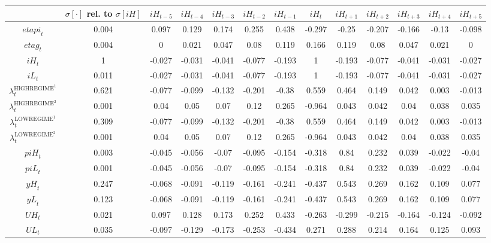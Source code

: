 \begin{tabular}{c|c|c|c|c|c|c|c|c|c|c|c|c|}
  & $\sigma[\cdot]$ rel. to $\sigma[{i\!H}]$ & ${i\!H}_{t-5}$ & ${i\!H}_{t-4}$ & ${i\!H}_{t-3}$ & ${i\!H}_{t-2}$ & ${i\!H}_{t-1}$ & ${i\!H}_{t}$ & ${i\!H}_{t+1}$ & ${i\!H}_{t+2}$ & ${i\!H}_{t+3}$ & ${i\!H}_{t+4}$ & ${i\!H}_{t+5}$\\
\hline
${e\!t\!a\!p\!i}_{t}$ & 0.004 & 0.097 & 0.129 & 0.174 & 0.255 & 0.438 & -0.297 & -0.25 & -0.207 & -0.166 & -0.13 & -0.098 \\
${e\!t\!a\!g}_{t}$ & 0.004 & 0 & 0.021 & 0.047 & 0.08 & 0.119 & 0.166 & 0.119 & 0.08 & 0.047 & 0.021 & 0 \\
${i\!H}_{t}$ & 1 & -0.027 & -0.031 & -0.041 & -0.077 & -0.193 & 1 & -0.193 & -0.077 & -0.041 & -0.031 & -0.027 \\
${i\!L}_{t}$ & 0.011 & -0.027 & -0.031 & -0.041 & -0.077 & -0.193 & 1 & -0.193 & -0.077 & -0.041 & -0.031 & -0.027 \\
$\lambda^{\mathrm{HIGHREGIME}^{\mathrm{1}}}_{t}$ & 0.621 & -0.077 & -0.099 & -0.132 & -0.201 & -0.38 & 0.559 & 0.464 & 0.149 & 0.042 & 0.003 & -0.013 \\
$\lambda^{\mathrm{HIGHREGIME}^{\mathrm{2}}}_{t}$ & 0.001 & 0.04 & 0.05 & 0.07 & 0.12 & 0.265 & -0.964 & 0.043 & 0.042 & 0.04 & 0.038 & 0.035 \\
$\lambda^{\mathrm{LOWREGIME}^{\mathrm{1}}}_{t}$ & 0.309 & -0.077 & -0.099 & -0.132 & -0.201 & -0.38 & 0.559 & 0.464 & 0.149 & 0.042 & 0.003 & -0.013 \\
$\lambda^{\mathrm{LOWREGIME}^{\mathrm{2}}}_{t}$ & 0.001 & 0.04 & 0.05 & 0.07 & 0.12 & 0.265 & -0.964 & 0.043 & 0.042 & 0.04 & 0.038 & 0.035 \\
${p\!i\!H}_{t}$ & 0.003 & -0.045 & -0.056 & -0.07 & -0.095 & -0.154 & -0.318 & 0.84 & 0.232 & 0.039 & -0.022 & -0.04 \\
${p\!i\!L}_{t}$ & 0.001 & -0.045 & -0.056 & -0.07 & -0.095 & -0.154 & -0.318 & 0.84 & 0.232 & 0.039 & -0.022 & -0.04 \\
${y\!H}_{t}$ & 0.247 & -0.068 & -0.091 & -0.119 & -0.161 & -0.241 & -0.437 & 0.543 & 0.269 & 0.162 & 0.109 & 0.077 \\
${y\!L}_{t}$ & 0.123 & -0.068 & -0.091 & -0.119 & -0.161 & -0.241 & -0.437 & 0.543 & 0.269 & 0.162 & 0.109 & 0.077 \\
${U\!H}_{t}$ & 0.021 & 0.097 & 0.128 & 0.173 & 0.252 & 0.433 & -0.263 & -0.299 & -0.215 & -0.164 & -0.124 & -0.092 \\
${U\!L}_{t}$ & 0.035 & -0.097 & -0.129 & -0.173 & -0.253 & -0.434 & 0.271 & 0.288 & 0.214 & 0.164 & 0.125 & 0.093 \\
\hline
\end{tabular}


